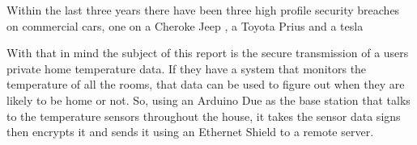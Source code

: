 Within the last three years there have been three high profile security breaches on commercial cars, one on a Cheroke Jeep \cite{jeephack}, a Toyota Prius \cite{priushack} and a tesla \cite{teslahack}

With that in mind the subject of this report is the secure transmission of a users private home temperature data. If they have a system that monitors the temperature of all the rooms, that data can be used to figure out when they are likely to be home or not. So, using an Arduino Due as the base station that talks to the temperature sensors throughout the house, it takes the sensor data signs then encrypts it and sends it using an Ethernet Shield to a remote server. 